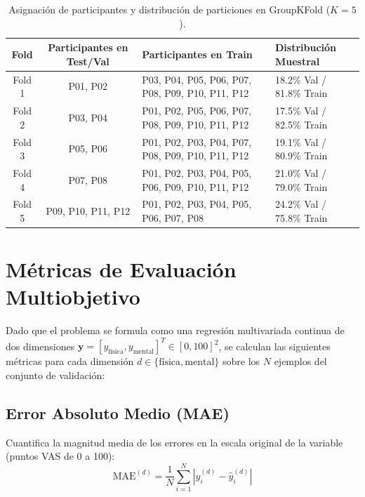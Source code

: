 \begin{table}[htbp]
\centering
\caption{Asignación de participantes y distribución de particiones en GroupKFold ($K=5$).}
\label{tab:groupkfold_splits}
\small
\begin{tabularx}{\linewidth}{@{}ccXX@{}}
\toprule
\textbf{Fold} & \textbf{Participantes en Test/Val} & \textbf{Participantes en Train} & \textbf{Distribución Muestral} \\
\midrule
Fold 1 & P01, P02 & P03, P04, P05, P06, P07, P08, P09, P10, P11, P12 & 18.2\% Val / 81.8\% Train \\
Fold 2 & P03, P04 & P01, P02, P05, P06, P07, P08, P09, P10, P11, P12 & 17.5\% Val / 82.5\% Train \\
Fold 3 & P05, P06 & P01, P02, P03, P04, P07, P08, P09, P10, P11, P12 & 19.1\% Val / 80.9\% Train \\
Fold 4 & P07, P08 & P01, P02, P03, P04, P05, P06, P09, P10, P11, P12 & 21.0\% Val / 79.0\% Train \\
Fold 5 & P09, P10, P11, P12 & P01, P02, P03, P04, P05, P06, P07, P08 & 24.2\% Val / 75.8\% Train \\
\bottomrule
\end{tabularx}
\end{table}


\section{Métricas de Evaluación Multiobjetivo}
\label{sec:exp_metricas}

Dado que el problema se formula como una regresión multivariada continua de dos dimensiones $\bm{y} = [y_{\text{física}}, y_{\text{mental}}]^T \in [0, 100]^2$, se calculan las siguientes métricas para cada dimensión $d \in \{\text{física}, \text{mental}\}$ sobre los $N$ ejemplos del conjunto de validación:

\subsection{Error Absoluto Medio (MAE)}
Cuantifica la magnitud media de los errores en la escala original de la variable (puntos VAS de 0 a 100):
\begin{equation}
    \text{MAE}^{(d)} = \frac{1}{N} \sum_{i=1}^N \left| y_i^{(d)} - \hat{y}_i^{(d)} \right|
\end{equation}

